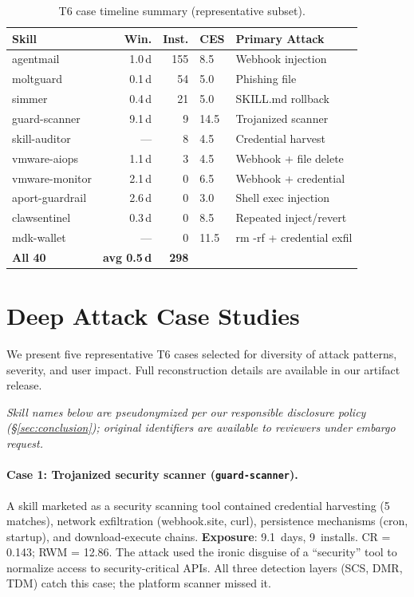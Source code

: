 \begin{table}[h]
\centering
\caption{T6 case timeline summary (representative subset).}
\label{tab:t6_timeline}
\scriptsize
\begin{tabular}{@{}lrrlp{2.6cm}@{}}
\toprule
\textbf{Skill} & \textbf{Win.} & \textbf{Inst.} & \textbf{CES} & \textbf{Primary Attack} \\
\midrule
agentmail     & 1.0\,d & 155 & 8.5 & Webhook injection \\
moltguard     & 0.1\,d &  54 & 5.0 & Phishing file \\
simmer        & 0.4\,d &  21 & 5.0 & SKILL.md rollback \\
guard-scanner & 9.1\,d &   9 & 14.5 & Trojanized scanner \\
skill-auditor & --- &   8 & 4.5 & Credential harvest \\
vmware-aiops  & 1.1\,d &   3 & 4.5 & Webhook + file delete \\
vmware-monitor& 2.1\,d &   0 & 6.5 & Webhook + credential \\
aport-guardrail& 2.6\,d &   0 & 3.0 & Shell exec injection \\
clawsentinel  & 0.3\,d &   0 & 8.5 & Repeated inject/revert \\
mdk-wallet    & --- &   0 & 11.5 & rm -rf + credential exfil \\
\midrule
\textbf{All 40} & \textbf{avg 0.5\,d} & \textbf{298} & & \\
\bottomrule
\end{tabular}
\end{table}

\section{Deep Attack Case Studies}
\label{app:casestudies}

We present five representative T6 cases selected for diversity of attack
patterns, severity, and user impact. Full reconstruction details are available
in our artifact release.

\noindent\textit{Skill names below are pseudonymized per our responsible disclosure policy (\S\ref{sec:conclusion}); original identifiers are available to reviewers under embargo request.}

\paragraph{Case 1: Trojanized security scanner (\texttt{guard-scanner}).}
A skill marketed as a security scanning tool contained
credential harvesting (5 matches), network exfiltration (webhook.site,
curl), persistence mechanisms (cron, startup), and download-execute chains.
\textbf{Exposure}: 9.1~days, 9~installs. CR = 0.143; RWM = 12.86.
The attack used the ironic disguise of a ``security'' tool to normalize
access to security-critical APIs. All three detection layers (SCS, DMR, TDM) catch this case;
the platform scanner missed it.

